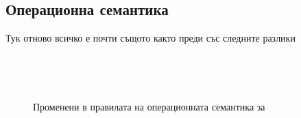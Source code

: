 

\subsection{Операционна семантика}


Тук отново всичко е почти същото както преди със следните разлики 

\begin{framed}
\begin{figure}[H]
  \begin{subfigure}[b]{0.5\textwidth}
    \begin{prooftree}
    \end{prooftree}
  \end{subfigure}
  ~
  \begin{subfigure}[b]{0.5\textwidth}
    \begin{prooftree}
    \end{prooftree}
  \end{subfigure}

  \vspace{10pt}
  
  \begin{subfigure}[b]{0.5\textwidth}
    \begin{prooftree}
    \end{prooftree}
  \end{subfigure}
  ~
  \begin{subfigure}[b]{0.5\textwidth}
    \begin{prooftree}
    \end{prooftree}
  \end{subfigure}
  \caption{Променени в правилата на операционната семантика за \PCFBOOL}
\end{figure}
\end{framed}




